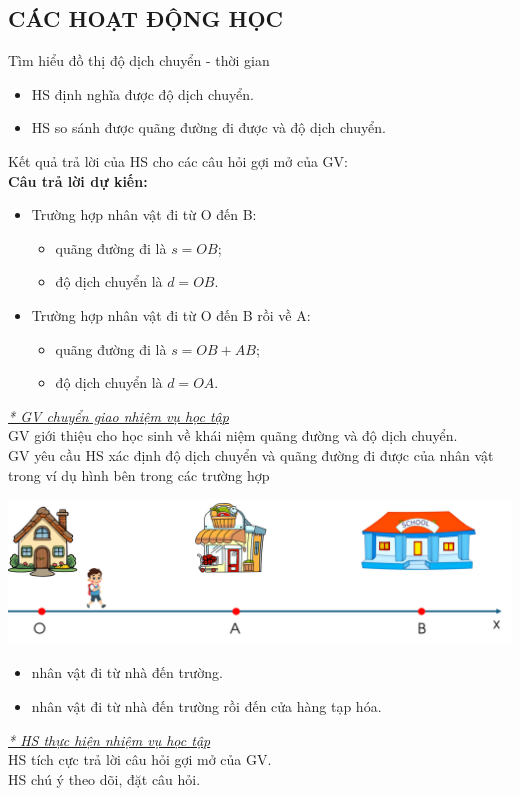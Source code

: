 \subsection{CÁC HOẠT ĐỘNG HỌC}
\hoatdong
{
	Tìm hiểu đồ thị độ dịch chuyển - thời gian
}
{\begin{itemize}
		\item HS định nghĩa được độ dịch chuyển.
		\item  HS so sánh được quãng đường đi được và độ dịch chuyển.
	\end{itemize}
	
}
{
	Kết quả trả lời của HS cho các câu hỏi gợi mở của GV:\\
	\textbf{Câu trả lời dự kiến:} 
	\begin{itemize}
		\item Trường hợp nhân vật đi từ O đến B:
		\begin{itemize}
			\item quãng đường đi là $s=OB$;
			\item độ dịch chuyển là $d=OB$.
		\end{itemize}
		\item Trường hợp nhân vật đi từ O đến B rồi về A:
		\begin{itemize}
			\item quãng đường đi là $s=OB+AB$;
			\item độ dịch chuyển là $d=OA$.
		\end{itemize}
	\end{itemize}
}
{\textit{\underline{* GV chuyển giao nhiệm vụ học tập}}\\
	GV giới thiệu cho học sinh về khái niệm quãng đường và độ dịch chuyển.\\
	GV yêu cầu HS xác định độ dịch chuyển và quãng đường đi được của nhân vật trong ví dụ hình bên trong các trường hợp
	\begin{center}
		\includegraphics[width=0.9\linewidth]{figs/BAI4-1}
	\end{center}
	\begin{itemize}
		\item nhân vật đi từ nhà đến trường.
		\item nhân vật đi từ nhà đến trường rồi đến cửa hàng tạp hóa.
	\end{itemize}
	\textit{\underline{* HS thực hiện nhiệm vụ học tập}}\\
	HS tích cực trả lời câu hỏi gợi mở của GV.\\
	HS chú ý theo dõi, đặt câu hỏi.
}
